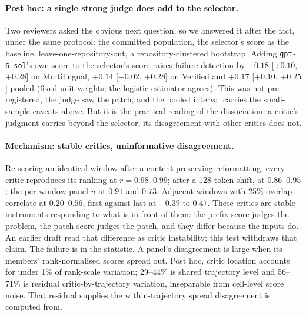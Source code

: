 \documentclass[10pt]{article}
\begin{document}
\paragraph{Post hoc: a single strong judge does add to the selector.} Two reviewers asked the obvious next question, so we answered it after the fact, under the same protocol: the committed population, the selector's score as the baseline, leave-one-repository-out, a repository-clustered bootstrap. Adding \texttt{gpt-6-sol}'s own score to the selector's score raises failure detection by $+0.18$ [$+0.10$, $+0.28$] on Multilingual, $+0.14$ [$-0.02$, $+0.28$] on Verified and $+0.17$ [$+0.10$, $+0.25$] pooled (fixed unit weights; the logistic estimator agrees). This was not pre-registered, the judge saw the patch, and the pooled interval carries the small-sample caveats above. But it is the practical reading of the dissociation: a critic's judgment carries beyond the selector; its disagreement with other critics does not.

\paragraph{Mechanism: stable critics, uninformative disagreement.}
Re-scoring an identical window after a content-preserving reformatting, every critic reproduces its ranking at $r=0.98$--$0.99$; after a 128-token shift, at $0.86$--$0.95$; the per-window panel $u$ at $0.91$ and $0.73$. Adjacent windows with 25\% overlap correlate at $0.20$--$0.56$, first against last at $-0.39$ to $0.47$. These critics are stable instruments responding to what is in front of them: the prefix score judges the problem, the patch score judges the patch, and they differ because the inputs do. An earlier draft read that difference as critic instability; this test withdraws that claim. The failure is in the statistic. A panel's disagreement is large when its members' rank-normalised scores spread out. Post hoc, critic location accounts for under 1\% of rank-scale variation; 29--44\% is shared trajectory level and 56--71\% is residual critic-by-trajectory variation, inseparable from cell-level score noise. That residual supplies the within-trajectory spread disagreement is computed from.
\end{document}
